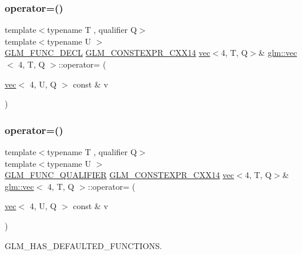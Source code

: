 \subsubsection{\texorpdfstring{operator=()}{operator=()}\hspace{0.1cm}{\footnotesize\ttfamily [2/3]}}
{\footnotesize\ttfamily template$<$typename T , qualifier Q$>$ \\
template$<$typename U $>$ \\
\hyperlink{setup_8hpp_ab2d052de21a70539923e9bcbf6e83a51}{G\+L\+M\+\_\+\+F\+U\+N\+C\+\_\+\+D\+E\+CL} \hyperlink{setup_8hpp_a4dd12abf5e1164bc57f3a34671d03844}{G\+L\+M\+\_\+\+C\+O\+N\+S\+T\+E\+X\+P\+R\+\_\+\+C\+X\+X14} \hyperlink{structglm_1_1vec}{vec}$<$4, T, Q$>$\& \hyperlink{structglm_1_1vec}{glm\+::vec}$<$ 4, T, Q $>$\+::operator= (\begin{DoxyParamCaption}\item[{\hyperlink{structglm_1_1vec}{vec}$<$ 4, U, Q $>$ const \&}]{v }\end{DoxyParamCaption})}

\mbox{\label{structglm_1_1vec_3_014_00_01_t_00_01_q_01_4_a47b604569998091880bd33056928ab50}} 
\subsubsection{\texorpdfstring{operator=()}{operator=()}\hspace{0.1cm}{\footnotesize\ttfamily [3/3]}}
{\footnotesize\ttfamily template$<$typename T , qualifier Q$>$ \\
template$<$typename U $>$ \\
\hyperlink{setup_8hpp_a33fdea6f91c5f834105f7415e2a64407}{G\+L\+M\+\_\+\+F\+U\+N\+C\+\_\+\+Q\+U\+A\+L\+I\+F\+I\+ER} \hyperlink{setup_8hpp_a4dd12abf5e1164bc57f3a34671d03844}{G\+L\+M\+\_\+\+C\+O\+N\+S\+T\+E\+X\+P\+R\+\_\+\+C\+X\+X14} \hyperlink{structglm_1_1vec}{vec}$<$4, T, Q$>$\& \hyperlink{structglm_1_1vec}{glm\+::vec}$<$ 4, T, Q $>$\+::operator= (\begin{DoxyParamCaption}\item[{\hyperlink{structglm_1_1vec}{vec}$<$ 4, U, Q $>$ const \&}]{v }\end{DoxyParamCaption})}



G\+L\+M\+\_\+\+H\+A\+S\+\_\+\+D\+E\+F\+A\+U\+L\+T\+E\+D\+\_\+\+F\+U\+N\+C\+T\+I\+O\+NS. 

